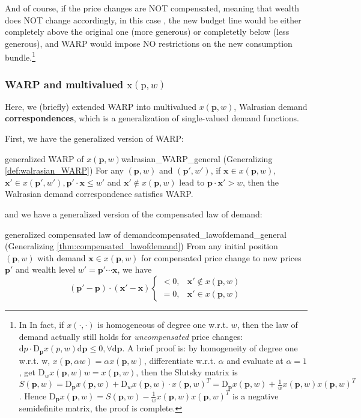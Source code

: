 And of course, if the price changes are NOT compensated, meaning that wealth does NOT change accordingly, in this case \citep[Figure 2.F.5, Page 33]{mas1995microeconomic}, the new budget line would be either completely above the original one (more generous) or completetly below (less generous), and WARP would impose NO restrictions on the new consumption bundle.\footnote{In
In fact, if $ x(\cdot,\cdot)$ is homogeneous of degree one w.r.t. $w$, then the law of demand actually still holds for \textit{uncompensated} price changes: $\mathrm{d}p\cdot\mathrm{D}_\mathbf{p} x(p,w)\mathrm{d}\mathbf{p}\leq 0,\forall \mathrm{d}\mathbf{p}$. A brief proof is: by homogeneity of degree one w.r.t. w, $ x(\mathbf{p},\alpha w)=\alpha  x(\mathbf{p},w)$,
differentiate w.r.t. $\alpha$ and evaluate at $\alpha =1$, get $\mathrm{D}_w  x(\mathbf{p}, w)w = x(\mathbf{p},w)$, then the Slutsky matrix is $S(\mathbf{p},w)=\mathrm{D}_{\mathbf{p}} x(\mathbf{p},w)+\mathrm{D}_w x(\mathbf{p},w)\cdot  x(\mathbf{p},w)^T=\mathrm{D}_{\mathbf{p}} x(\mathbf{p},w)+\frac{1}{w} x(\mathbf{p},w) x(\mathbf{p},w)^T$.
Hence $\mathrm{D}_{\mathbf{p}} x(\mathbf{p},w)=S(\mathbf{p},w)-\frac{1}{w} x(\mathbf{p},w) x(\mathbf{p},w)^T$ is a negative semidefinite matrix, the proof is complete.}

\subsubsection*{WARP and multivalued $\mathrm{x}(\mathrm{p},w)$}
Here, we (briefly) extended WARP into multivalued $ x(\mathbf{p},w)$, Walrasian demand \textbf{correspondences}, which is a generalization of single-valued demand functions.

First, we have the generalized version of WARP:
\begin{definition}{generalized WARP of $ x(\mathbf{p},w)$}{walrasian_WARP_general}
    (Generalizing \ref{def:walrasian_WARP}) For any $(\mathbf{p},w)$ and $(\mathbf{p'},w')$, if $\mathbf{x}\in x(\mathbf{p},w)$, $\mathbf{x}'\in x(\mathbf{p}',w'), \mathbf{p}'\cdot \mathbf{x}\leq w'$ and $\mathbf{x}'\notin  x(\mathbf{p},w)$ lead to $\mathbf{p}\cdot\mathbf{x}' > w$, then the Walrasian demand correspondence satisfies WARP.
\end{definition}

and we have a generalized version of the compensated law of demand:
\begin{theorem}{generalized compensated law of demand}{compensated_lawofdemand_general}
    (Generalizing \ref{thm:compensated_lawofdemand}) From any initial position $(\mathbf{p},w)$ with demand $\mathbf{x}\in  x(\mathbf{p},w)$ for compensated price change to new prices $\mathbf{p}'$ and wealth level $w'=\mathbf{p}'\cdots \mathbf{x}$, we have
    $$ (\mathbf{p}'-\mathbf{p})\cdot(\mathbf{x}'-\mathbf{x})\begin{cases}
        < 0, & \mathbf{x}'\notin x(\mathbf{p},w)\\
        =0, & \mathbf{x}'\in x(\mathbf{p},w)
    \end{cases}$$
\end{theorem}

